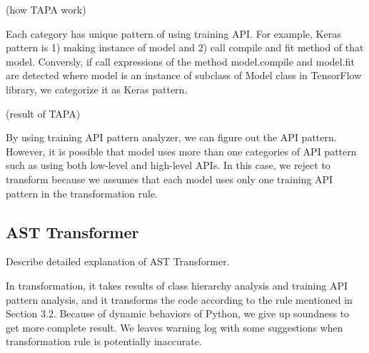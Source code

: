 (how TAPA work)

Each category has unique pattern of using training API.
For example, Keras pattern is 1) making instance of model and
2) call compile and fit method of that model.
Conversly, if call expressions of the method model.compile and model.fit are detected
where model is an instance of subclass of Model class in TensorFlow library,
we categorize it as Keras pattern.

(result of TAPA)

By using training API pattern analyzer, we can figure out the API pattern.
However, it is possible that model uses more than one categories of API pattern
such as using both low-level and high-level APIs.
In this case, we reject to transform because we assumes
that each model uses only one training API pattern in the transformation rule.

\subsection{AST Transformer}
Describe detailed explanation of AST Transformer.

In transformation, it takes results of class hierarchy analysis
and training API pattern analysis, and it transforms the code
according to the rule mentioned in Section 3.2.
Because of dynamic behaviors of Python, we give up soundness
to get more complete result.
We leaves warning log with some suggestions
when transformation rule is potentially inaccurate.

